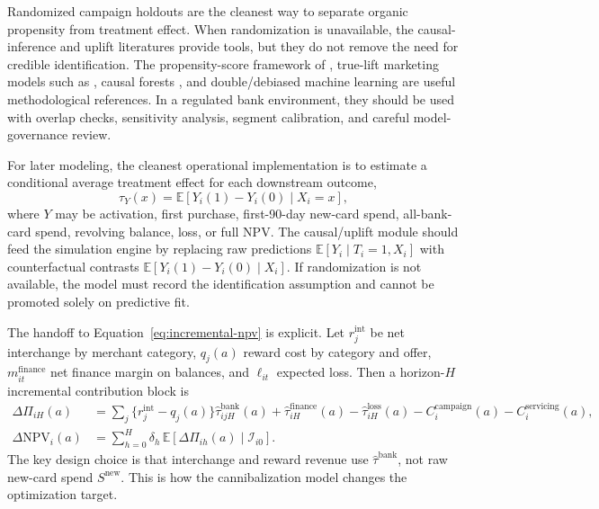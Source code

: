 \documentclass[11pt]{article}
\newcommand{\E}{\mathbb{E}}
\newcommand{\NPV}{\mathrm{NPV}}
\newcommand{\1}{\mathbf{1}}
\begin{document}
Randomized campaign holdouts are the cleanest way to separate organic
propensity from treatment effect. When randomization is unavailable, the
causal-inference and uplift literatures provide tools, but they do not remove
the need for credible identification. The propensity-score framework of
\citet{rosenbaum1983propensity}, true-lift marketing models such as
\citet{lo2002true}, causal forests \citep{wager2018causalforests}, and
double/debiased machine learning \citep{chernozhukov2018dml} are useful
methodological references. In a regulated bank environment, they should be used
with overlap checks, sensitivity analysis, segment calibration, and careful
model-governance review.

For later modeling, the cleanest operational implementation is to estimate a
conditional average treatment effect for each downstream outcome,
\begin{equation}
  \tau_Y(x)
  =
  \E[Y_i(1)-Y_i(0)\mid X_i=x],
  \label{eq:cate}
\end{equation}
where $Y$ may be activation, first purchase, first-90-day new-card spend,
all-bank-card spend, revolving balance, loss, or full NPV. The causal/uplift
module should feed the simulation engine by replacing raw predictions
$\E[Y_i\mid T_i=1,X_i]$ with counterfactual contrasts
$\E[Y_i(1)-Y_i(0)\mid X_i]$. If randomization is not available, the model must
record the identification assumption and cannot be promoted solely on predictive
fit.

The handoff to Equation~\eqref{eq:incremental-npv} is explicit. Let
$r_j^{\mathrm{int}}$ be net interchange by merchant category, $q_j(a)$ reward
cost by category and offer, $m^{\mathrm{finance}}_{it}$ net finance margin on
balances, and $\ell_{it}$ expected loss. Then a horizon-$H$ incremental
contribution block is
\begin{align}
  \Delta \Pi_{iH}(a)
    &=
    \sum_{j}
      \{r_j^{\mathrm{int}}-q_j(a)\}
      \widehat{\tau}^{\mathrm{bank}}_{ijH}(a)
    + \widehat{\tau}^{\mathrm{finance}}_{iH}(a)
    - \widehat{\tau}^{\mathrm{loss}}_{iH}(a)
    - C_i^{\mathrm{campaign}}(a)
    - C_i^{\mathrm{servicing}}(a),
    \label{eq:incremental-contribution}\\
  \Delta \NPV_i(a)
    &=
    \sum_{h=0}^{H}
      \delta_h\,\E[\Delta \Pi_{ih}(a)\mid \mathcal{I}_{i0}].
      \label{eq:cannibalization-to-npv}
\end{align}
The key design choice is that interchange and reward revenue use
$\widehat{\tau}^{\mathrm{bank}}$, not raw new-card spend
$S^{\mathrm{new}}$. This is how the cannibalization model changes the
optimization target.
\end{document}
